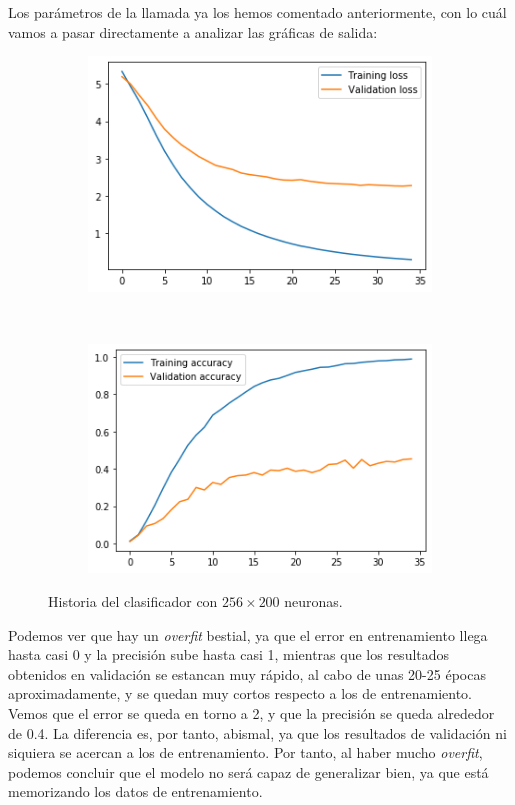 \documentclass[11pt,a4paper]{article}
\begin{document}
Los parámetros de la llamada ya los hemos comentado anteriormente, con lo cuál vamos a pasar directamente
a analizar las gráficas de salida:

\begin{figure}[H]
  \centering
  \begin{subfigure}{.5\textwidth}
    \centering
    \includegraphics[scale=0.4]{img/feat-m1-loss.png}
    \label{fig:feat-m1-loss}
  \end{subfigure}%
  ~ \quad
  \begin{subfigure}{.5\textwidth}
    \centering
    \includegraphics[scale=0.4]{img/feat-m1-acc.png}
    \label{fig:feat-m1-acc}
  \end{subfigure}
  \caption{Historia del clasificador con $256 \times 200$ neuronas.}
  \label{fig:history-feat-m1}
\end{figure}

Podemos ver que hay un \textit{overfit} bestial, ya que el error en entrenamiento llega
hasta casi 0 y la precisión sube hasta casi 1, mientras que los resultados obtenidos en
validación se estancan muy rápido, al cabo de unas 20-25 épocas aproximadamente, y se quedan
muy cortos respecto a los de entrenamiento. Vemos que el error se queda en torno a 2, y
que la precisión se queda alrededor de 0.4. La diferencia es, por tanto, abismal, ya que
los resultados de validación ni siquiera se acercan a los de entrenamiento. 
Por tanto, al haber mucho \textit{overfit}, podemos concluir que el modelo no
será capaz de generalizar bien, ya que está memorizando los datos de entrenamiento.
\end{document}
